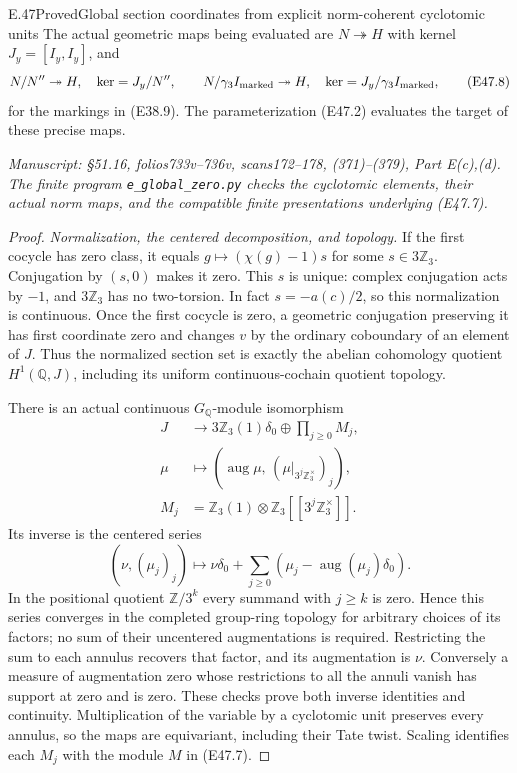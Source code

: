 \begin{statement}{E.47}{Proved}{Global section coordinates from explicit norm-coherent cyclotomic units}
The actual geometric maps being evaluated are
$N\twoheadrightarrow H$ with kernel
$J_y=[I_y,I_y]$, and
\[
 N/N''\twoheadrightarrow H,\quad\ker=J_y/N'',\qquad
 N/\gamma_3I_{\rm marked}\twoheadrightarrow H,\quad
                 \ker=J_y/\gamma_3I_{\rm marked},
 \tag{E47.8}
\]
for the markings in (E38.9). The parameterization
(E47.2) evaluates the target of these precise maps.

\emph{Manuscript: \S51.16, folios733v--736v,
scans172--178, (371)--(379), Part E(c),(d).
The finite program \texttt{e\_global\_zero.py}
checks the cyclotomic elements, their actual norm
maps, and the compatible finite presentations
underlying (E47.7).}
\end{statement}
\begin{proof}
\emph{Normalization, the centered decomposition, and topology.}
If the first cocycle has zero class, it equals
$g\mapsto(\chi(g)-1)s$ for some $s\in3\mathbb Z_3$.
Conjugation by $(s,0)$ makes it zero. This $s$ is
unique: complex conjugation acts by $-1$, and
$3\mathbb Z_3$ has no two-torsion. In fact
$s=-a(c)/2$, so this normalization is continuous.
Once the first
cocycle is zero, a geometric conjugation preserving
it has first coordinate zero and changes $v$ by the
ordinary coboundary of an element of $J$. Thus
the normalized section set is exactly the abelian
cohomology quotient $H^1(\mathbb Q,J)$, including its
uniform continuous-cochain quotient topology.

There is an actual continuous $G_{\mathbb Q}$-module
isomorphism
\[
 \begin{split}
 J&\longrightarrow 3\mathbb Z_3(1)\delta_0
       \oplus\prod_{j\ge0}M_j,\\
 \mu&\longmapsto
       (\operatorname{aug}\mu,\,
                    (\mu|_{3^j\mathbb Z_3^\times})_j),\\
 M_j&=\mathbb Z_3(1)\otimes
                    \mathbb Z_3[[3^j\mathbb Z_3^\times]].
 \end{split}
 \tag{E47.9}
\]
Its inverse is the centered series
\[
 (\nu,(\mu_j)_j)\longmapsto
      \nu\delta_0+
           \sum_{j\ge0}(\mu_j-\operatorname{aug}(\mu_j)\delta_0).
 \tag{E47.10}
\]
In the positional quotient $\mathbb Z/3^k$ every
summand with $j\ge k$ is zero. Hence this series
converges in the completed group-ring topology for
arbitrary choices of its factors; no sum of their
uncentered augmentations is required. Restricting
the sum to each annulus recovers that factor, and
its augmentation is $\nu$. Conversely a measure of
augmentation zero whose restrictions to all the
annuli vanish has support at zero and is zero.
These checks prove both inverse identities and
continuity. Multiplication of the variable by a
cyclotomic unit preserves every annulus, so the
maps are equivariant, including their Tate twist.
Scaling identifies each $M_j$ with the module $M$
in (E47.7).


\end{proof}
